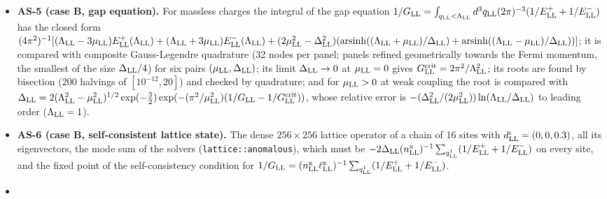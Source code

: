 \documentclass[
  10pt,
]{article}
\begin{document}
\begin{itemize}
  with
  \(\cos^2\vartheta^{\rm B}_{\rm LL}=\tfrac12(1+(\pm\varepsilon_{\rm LL}-\mu_{\rm LL})/E^\mp_{\rm LL})\)
  and the energies \(E^\mp_{\rm LL}\) of the \(16\times16\) matrix
  \(\mathsf H_{\rm LL}(\vec q_{\rm LL})\), for 50 random momenta
  (components uniform in \((-2,2)\)), chemical potentials (in \([0,1)\))
  and gaps (in \([0.1,1)\)); and the lattice spectrum
  \(\pm E^-_{\rm LL}\), \(\pm E^+_{\rm LL}\) (with
  \(\varepsilon^{\rm lat}_{\rm LL}\), each four times) on a chain of 32
  sites with \(\mu_{\rm LL}=0.6\), \(\Delta_{\rm LL}=0.3\).
\item
  \textbf{AS-5 (case B, gap equation).} For massless charges the
  integral of the gap equation
  \(1/G_{\rm LL}=\int_{q_{\rm LL}<\Lambda_{\rm LL}}d^3q_{\rm LL}(2\pi)^{-3}(1/E^+_{\rm LL}+1/E^-_{\rm LL})\)
  has the closed form
  \((4\pi^2)^{-1}[(\Lambda_{\rm LL}-3\mu_{\rm LL})E^+_{\rm LL}(\Lambda_{\rm LL})+(\Lambda_{\rm LL}+3\mu_{\rm LL})E^-_{\rm LL}(\Lambda_{\rm LL})+(2\mu_{\rm LL}^2-\Delta_{\rm LL}^2)(\mathrm{arsinh}((\Lambda_{\rm LL}+\mu_{\rm LL})/\Delta_{\rm LL})+\mathrm{arsinh}((\Lambda_{\rm LL}-\mu_{\rm LL})/\Delta_{\rm LL}))]\);
  it is compared with composite Gauss-Legendre quadrature (32 nodes per
  panel; panels refined geometrically towards the Fermi momentum, the
  smallest of the size \(\Delta_{\rm LL}/4\)) for six pairs
  \((\mu_{\rm LL},\Delta_{\rm LL})\); its limit \(\Delta_{\rm LL}\to0\)
  at \(\mu_{\rm LL}=0\) gives
  \(G^{\rm crit}_{\rm LL}=2\pi^2/\Lambda_{\rm LL}^2\); its roots are
  found by bisection (200 halvings of \([10^{-12},20]\)) and checked by
  quadrature; and for \(\mu_{\rm LL}>0\) at weak coupling the root is
  compared with
  \(\Delta_{\rm LL}=2(\Lambda_{\rm LL}^2-\mu_{\rm LL}^2)^{1/2}\exp(-\tfrac32)\exp(-(\pi^2/\mu_{\rm LL}^2)(1/G_{\rm LL}-1/G^{\rm crit}_{\rm LL}))\),
  whose relative error is
  \(-(\Delta_{\rm LL}^2/(2\mu_{\rm LL}^2))\ln(\Lambda_{\rm LL}/\Delta_{\rm LL})\)
  to leading order (\(\Lambda_{\rm LL}=1\)).
\item
  \textbf{AS-6 (case B, self-consistent lattice state).} The dense
  \(256\times256\) lattice operator of a chain of 16 sites with
  \(d^\iota_{\rm LL}=(0,0,0.3)\), all its eigenvectors, the mode sum of
  the solvers (\texttt{lattice::anomalous}), which must be
  \(-2\Delta_{\rm LL}(n^{\rm x}_{\rm LL})^{-1}\sum_{q^1_{\rm LL}}(1/E^+_{\rm LL}+1/E^-_{\rm LL})\)
  on every site, and the fixed point of the self-consistency condition
  for
  \(1/G_{\rm LL}=(n^{\rm x}_{\rm LL}\ell^{\rm x}_{\rm LL})^{-1}\sum_{q^1_{\rm LL}}(1/E^+_{\rm LL}+1/E^-_{\rm LL})\).
\item

\end{itemize}
\end{document}
